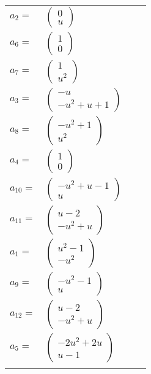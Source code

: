 \documentclass[1p]{elsarticle_modified}
\theoremstyle{definition}
\begin{document}
\begin{tabular}{m{7pt} m{180pt} m{7pt} m{180pt} }
\flushright $a_{2}=$&$\begin{pmatrix}0\\u\end{pmatrix}$ \\
\flushright $a_{6}=$&$\begin{pmatrix}1\\0\end{pmatrix}$ \\
\flushright $a_{7}=$&$\begin{pmatrix}1\\u^2\end{pmatrix}$ \\
\flushright $a_{3}=$&$\begin{pmatrix}- u\\- u^2+u+1\end{pmatrix}$ \\
\flushright $a_{8}=$&$\begin{pmatrix}- u^2+1\\u^2\end{pmatrix}$ \\
\flushright $a_{4}=$&$\begin{pmatrix}1\\0\end{pmatrix}$ \\
\flushright $a_{10}=$&$\begin{pmatrix}- u^2+u-1\\u\end{pmatrix}$ \\
\flushright $a_{11}=$&$\begin{pmatrix}u-2\\- u^2+u\end{pmatrix}$ \\
\flushright $a_{1}=$&$\begin{pmatrix}u^2-1\\- u^2\end{pmatrix}$ \\
\flushright $a_{9}=$&$\begin{pmatrix}- u^2-1\\u\end{pmatrix}$ \\
\flushright $a_{12}=$&$\begin{pmatrix}u-2\\- u^2+u\end{pmatrix}$ \\
\flushright $a_{5}=$&$\begin{pmatrix}-2 u^2+2 u\\u-1\end{pmatrix}$\\&\end{tabular}
\end{document}
